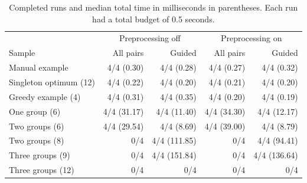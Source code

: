 \begin{table}[tb]
\caption{Completed runs and median total time in milliseconds in parentheses.
Each run had a total budget of 0.5 seconds.}
\label{tab:guided-evidence}
\centering
\small
\setlength{\tabcolsep}{4pt}
\begin{tabular}{lrrrr}
\hline
& \multicolumn{2}{c}{Preprocessing off} & \multicolumn{2}{c}{Preprocessing on} \\
Sample & All pairs & Guided & All pairs & Guided \\
\hline
Manual example & 4/4 (0.30) & 4/4 (0.28) & 4/4 (0.27) & 4/4 (0.32) \\
Singleton optimum (12) & 4/4 (0.22) & 4/4 (0.20) & 4/4 (0.21) & 4/4 (0.20) \\
Greedy example (4) & 4/4 (0.31) & 4/4 (0.35) & 4/4 (0.20) & 4/4 (0.19) \\
One group (6) & 4/4 (31.17) & 4/4 (11.40) & 4/4 (34.30) & 4/4 (12.17) \\
Two groups (6) & 4/4 (29.54) & 4/4 (8.69) & 4/4 (39.00) & 4/4 (8.79) \\
Two groups (8) & 0/4 & 4/4 (111.85) & 0/4 & 4/4 (94.41) \\
Three groups (9) & 0/4 & 4/4 (151.84) & 0/4 & 4/4 (136.64) \\
Three groups (12) & 0/4 & 0/4 & 0/4 & 0/4 \\
\hline
\end{tabular}
\end{table}
